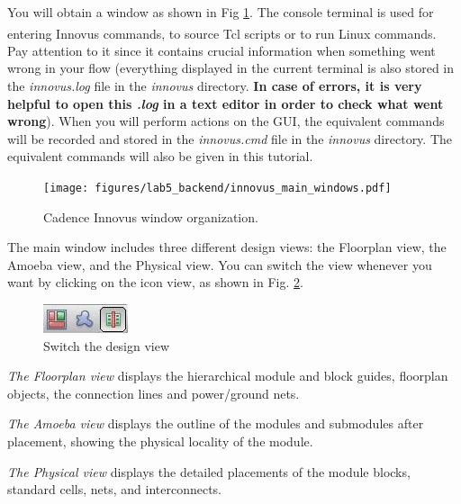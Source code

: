 You will obtain a window as shown in Fig \ref{fig_main_window}. The console terminal is used for entering Innovus\textsuperscript{\tiny\textregistered} commands, to source Tcl scripts or to run Linux commands. Pay attention to it since it contains crucial information when something went wrong in your flow (everything displayed in the current terminal is also stored in the \textit{innovus.log} file in the \textit{innovus} directory. \textbf{In case of errors, it is very helpful to open this \textit{.log} in a text editor in order to check what went wrong}). When you will perform actions on the GUI, the equivalent commands will be recorded and stored in the \textit{innovus.cmd} file in the \textit{innovus} directory. The equivalent commands will also be given in this tutorial.
\begin{figure}[!h]
	\centering
	\texttt{[image: figures/lab5\_backend/innovus\_main\_windows.pdf]}
	\caption{Cadence Innovus window organization.}
	\label{fig_main_window}
\end{figure}

The main window includes three different design views: the Floorplan view, the Amoeba view, and the Physical view. You can switch the view whenever you want by clicking on the icon view, as shown in Fig. \ref{fig_switch_view}.
\begin{itemize}
	\parbox[t]{\dimexpr\textwidth-\leftmargin}{%
	\begin{figure}
		\vspace{0mm}
		\centering
		\vspace{-\baselineskip}
	\includegraphics[scale=1]{figures/lab5_backend/switch_view}
\caption{Switch the design view}
\label{fig_switch_view}
	\end{figure}
	\item \textit{The Floorplan view} displays the hierarchical module and block guides, floorplan objects, the connection lines and power/ground nets.
	\item \textit{The Amoeba view} displays the outline of the modules and submodules after placement, showing the physical locality of the module.
}
	\item \textit{The Physical view} displays the detailed placements of the module blocks, standard cells, nets, and interconnects.
\end{itemize}

